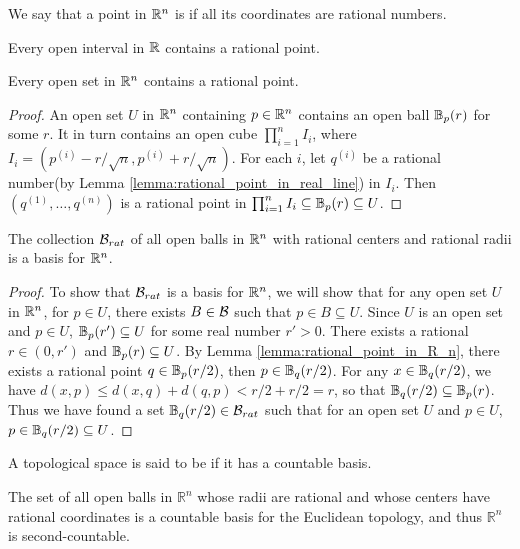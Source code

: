 \documentclass[11pt,a4paper]{article}
\begin{document}
We say that a point in $\mathbb{R}^n$ is  if all its coordinates are rational numbers.

\begin{lemma}\label{lemma:rational_point_in_real_line}
Every open interval in $\mathbb{R}$ contains a rational point.
\end{lemma}

\begin{lemma}\label{lemma:rational_point_in_R_n}
Every open set in $\mathbb{R}^n$ contains a rational point.
\end{lemma}

\begin{proof}
An open set $U$ in $\mathbb{R}^n$ containing $p\in\mathbb{R}^n$ contains an open ball $\mathbb{B}_p(r)$ for some $r$. It in turn contains an open cube $\prod_{i=1}^n I_i$, where $I_i =  (p^{(i)}-r/\sqrt{n}, p^{(i)}+r/\sqrt{n})$. For each $i$, let $q^{(i)}$ be a rational number(by Lemma \ref{lemma:rational_point_in_real_line}) in $I_i$. Then $(q^{(1)},\ldots,q^{(n)})$ is a rational point in $\prod_{i=1}^n I_i\subseteq \mathbb{B}_p(r)\subseteq U$.
\end{proof}

\begin{prop}
The collection $\mathcal{B}_{rat}$ of all open balls in $\mathbb{R}^n$ with rational centers and rational radii is a basis for $\mathbb{R}^n$.
\end{prop}

\begin{proof}
To show that $\mathcal{B}_{rat}$ is a basis for $\mathbb{R}^n$, we will show that for any open set $U$ in $\mathbb{R}^n$, for $p\in U$, there exists $B\in\mathcal{B}$ such that $p\in B\subseteq U$. Since $U$ is an open set and $p\in U$, $\mathbb{B}_p(r')\subseteq U$ for some real number $r'>0$. There exists a rational $r\in (0,r')$ and $\mathbb{B}_p(r)\subseteq U$. By Lemma \ref{lemma:rational_point_in_R_n}, there exists a rational point $q\in\mathbb{B}_p(r/2)$, then $p\in \mathbb{B}_q(r/2)$. For any $x\in \mathbb{B}_q(r/2)$, we have $d(x,p)\le d(x,q)+d(q,p) < r/2+r/2 = r$, so that $\mathbb{B}_q(r/2)\subseteq \mathbb{B}_p(r)$. Thus we have found a set $\mathbb{B}_q(r/2)\in \mathcal{B}_{rat}$ such that for an open set $U$ and $p\in U$, $p\in \mathbb{B}_q(r/2)\subseteq U$.
\end{proof}

\begin{mydef}
    A topological space is said to be  if it has a countable basis.
\end{mydef}

\begin{prop}
    The set of all open balls in $\mathbb{R}^n$ whose radii are rational and whose centers have rational coordinates is a countable basis for the Euclidean topology, and thus $\mathbb{R}^n$ is second-countable.
\end{prop}
\end{document}
